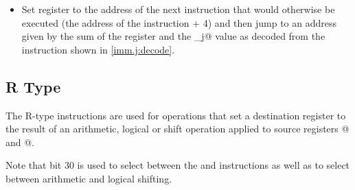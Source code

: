 \begin{itemize}
\item{}
\label{insn:jal}

Set register \verb@rd@ to the address of the next instruction that would 
otherwise be executed (the address of the \verb@jal@ instruction + 4) and then
jump to an address given by the sum of the \verb@pc@ register and the 
\verb@imm_j@ value as decoded from the instruction shown in \autoref{imm.j:decode}.



\end{itemize}


\subsection{R Type}
\label{insnformat:rtype}

The R-type instructions are used for operations that set a destination 
register \verb@rd@ to the result of an arithmetic, logical or shift operation
applied to source registers @ and @.

Note that bit 30 is used to select between the \verb@add@ and \verb@sub@ instructions
as well as to select between arithmetic and logical shifting.

